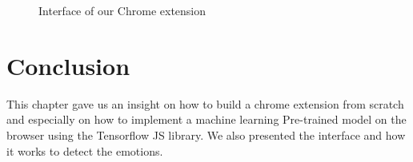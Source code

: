 \documentclass[12pt,a4paper,oneside,english]{book}
\begin{document}
\begin{figure}[H]
\begin{center}
\quad
{}
\caption{Interface of our Chrome extension}
\label{fig:browserinterface}
\end{center}
\end{figure}


\section*{Conclusion}
This chapter gave us an insight on how to build a chrome extension from scratch and especially on how to implement a machine learning Pre-trained model on the browser using the Tensorflow JS library. We also presented the interface and how it works to detect the emotions.
\end{document}
